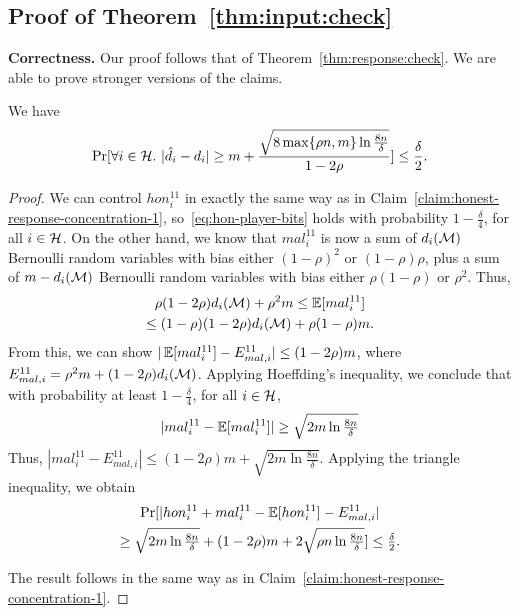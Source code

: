 \subsection{Proof of Theorem~\ref{thm:input:check}}\label{app:b3a2}

\textbf{Correctness.}
Our proof follows that of Theorem~\ref{thm:response:check}. We are able to prove stronger versions of the claims.

\begin{claim}\label{claim:honest-input-concentration-1}
We have
\[
    \Pr[\forall i \in \mathcal{H}.~|\hat{d}_i - d_i| \geq m+\frac{\sqrt{8\max\{\rho n, m\} \ln \frac{8n}{\delta}}}{1-2\rho}] \leq \frac{\delta}{2}.
\]
\end{claim}

\begin{proof}
We can control $hon_i^{11}$ in exactly the same way as in Claim~\ref{claim:honest-response-concentration-1}, so~\eqref{eq:hon-player-bits} holds with probability $1-\frac{\delta}{4}$, for all $i \in \mathcal{H}$.
On the other hand, we know that $mal_i^{11}$ is now a sum of $d_i(\mathcal{M})$ Bernoulli random variables with bias either $(1-\rho)^2$ or $(1-\rho)\rho$, plus a sum of $m - d_i(\mathcal{M})$ Bernoulli random variables with bias either $\rho(1-\rho)$ or $\rho^2$. Thus, 
\begin{multline*}
	\rho(1-2\rho)d_i(\mathcal{M}) + \rho^2 m \leq \operatorname{\mathbb{E}}[mal_i^{11}] \\
	\leq (1-\rho)(1-2\rho)d_i(\mathcal{M}) + \rho(1-\rho) m.
\end{multline*}
From this, we can show $|\operatorname{\mathbb{E}}[mal_i^{11}] - E_{mal,i}^{11}| \leq (1-2\rho)m$, where $E_{mal,i}^{11} = \rho^2 m + (1-2\rho) d_i(\mathcal{M})$.
 Applying Hoeffding's inequality, we conclude that with probability at least $1 - \frac{\delta}{4}$, for all $i \in \mathcal{H}$,
\[
    |mal_i^{11} - \operatorname{\mathbb{E}}[mal_i^{11}]| \geq \sqrt{2m \ln \tfrac{8n}{\delta}}
\]
Thus, $|mal_i^{11} - E_{mal,i}^{11}| \leq (1-2\rho)m + \sqrt{2m \ln \tfrac{8n}{\delta}}$. Applying the triangle inequality, we obtain
\begin{multline*}
\Pr[|hon_i^{11} + mal_i^{11} - \operatorname{\mathbb{E}}[hon_i^{11}] - E_{mal,i}^{11}| \\ \geq \sqrt{2m \ln \tfrac{8n}{\delta}} + (1-2\rho)m + 2\sqrt{ \rho n \ln \tfrac{8n}{\delta}}] \leq \tfrac{\delta}{2}.
\end{multline*}

The result follows in the same way as in Claim~\ref{claim:honest-response-concentration-1}.
\end{proof}

